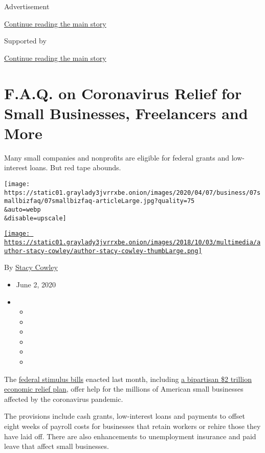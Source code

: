 Advertisement

\protect\hyperlink{after-top}{Continue reading the main story}

Supported by

\protect\hyperlink{after-sponsor}{Continue reading the main story}

\hypertarget{faq-on-coronavirus-relief-for-small-businesses-freelancers-and-more}{%
\section{F.A.Q. on Coronavirus Relief for Small Businesses, Freelancers
and
More}\label{faq-on-coronavirus-relief-for-small-businesses-freelancers-and-more}}

Many small companies and nonprofits are eligible for federal grants and
low-interest loans. But red tape abounds.

\texttt{[image: https://static01.graylady3jvrrxbe.onion/images/2020/04/07/business/07smallbizfaq/07smallbizfaq-articleLarge.jpg?quality=75\\\&auto=webp\\\&disable=upscale]}

\href{https://www.nytimes3xbfgragh.onion/by/stacy-cowley}{\texttt{[image: https://static01.graylady3jvrrxbe.onion/images/2018/10/03/multimedia/author-stacy-cowley/author-stacy-cowley-thumbLarge.png]}}

By \href{https://www.nytimes3xbfgragh.onion/by/stacy-cowley}{Stacy
Cowley}

\begin{itemize}
\item
  June 2, 2020
\item
  \begin{itemize}
  \item
  \item
  \item
  \item
  \item
  \item
  \end{itemize}
\end{itemize}

The
\href{https://www.nytimes3xbfgragh.onion/2020/06/02/business/economy/major-employers-coronavirus-relief.html}{federal
stimulus bills} enacted last month, including
\href{https://www.nytimes3xbfgragh.onion/2020/03/26/us/coronavirus-senate-stimulus-package.html}{a
bipartisan \$2 trillion economic relief plan}, offer help for the
millions of American small businesses affected by the coronavirus
pandemic.

The provisions include cash grants, low-interest loans and payments to
offset eight weeks of payroll costs for businesses that retain workers
or rehire those they have laid off. There are also enhancements to
unemployment insurance and paid leave that affect small businesses.

